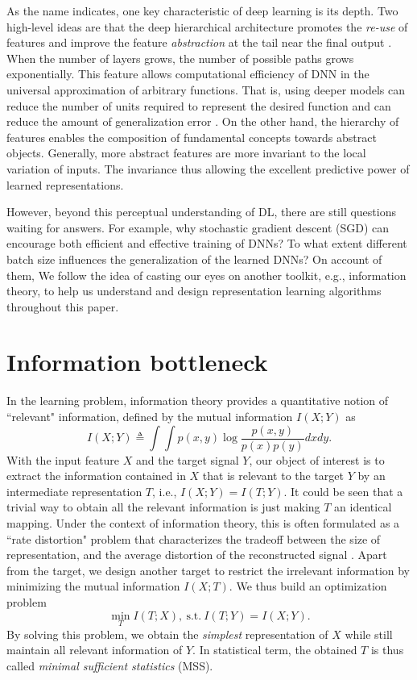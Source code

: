 As the name indicates, one key characteristic of deep learning is its depth. Two high-level ideas are that the deep hierarchical architecture promotes the \emph{re-use} of features and improve the feature \emph{abstraction} at the tail near the final output \cite{bengio2013representation}. When the number of layers grows, the number of possible paths grows exponentially. This feature allows computational efficiency of DNN in the universal approximation of arbitrary functions. That is, using deeper models can reduce the number of units required to represent the desired function and can reduce the amount of generalization error \cite{goodfellow2016deep}. On the other hand, the hierarchy of features enables the composition of fundamental concepts towards abstract objects. Generally, more abstract features are more invariant to the local variation of inputs. The invariance thus allowing the excellent predictive power of learned representations. 

However, beyond this perceptual understanding of DL, there are still questions waiting for answers. For example, why stochastic gradient descent (SGD) can encourage both efficient and effective training of DNNs? To what extent different batch size influences the generalization of the learned DNNs? On account of them, We follow the idea of casting our eyes on another toolkit, e.g., information theory, to help us understand and design representation learning algorithms throughout this paper.


\section{Information bottleneck}
In the learning problem, information theory provides a quantitative notion of ``relevant" information, defined by the mutual information $I(X;Y)$ as
\begin{equation}
    I(X;Y) \triangleq \int \int p(x,y) \log \frac{p(x,y)}{p(x)p(y)} dx dy.
\end{equation}
With the input feature $X$ and the target signal $Y$, our object of interest is to extract the information contained in $X$ that is relevant to the target $Y$ by an intermediate representation $T$, i.e., $I(X;Y)=I(T;Y)$.  It could be seen that a trivial way to obtain all the relevant information is just making $T$ an identical mapping. Under the context of information theory, this is often formulated as a ``rate distortion" problem that characterizes the tradeoff between the size of representation, and the average distortion of the reconstructed signal \cite{cover1999elements}. Apart from the target, we design another target to restrict the irrelevant information by minimizing the mutual information $I(X;T)$. We thus build an optimization problem
\begin{equation} \label{eq:mss}
    \min_T I(T;X), \ \text{s.t.} \ I(T;Y)=I(X;Y).
\end{equation}
By solving this problem, we obtain the \emph{simplest} representation of $X$ while still maintain all relevant information of $Y$. In statistical term, the obtained $T$ is thus called \emph{minimal sufficient statistics} (MSS).

